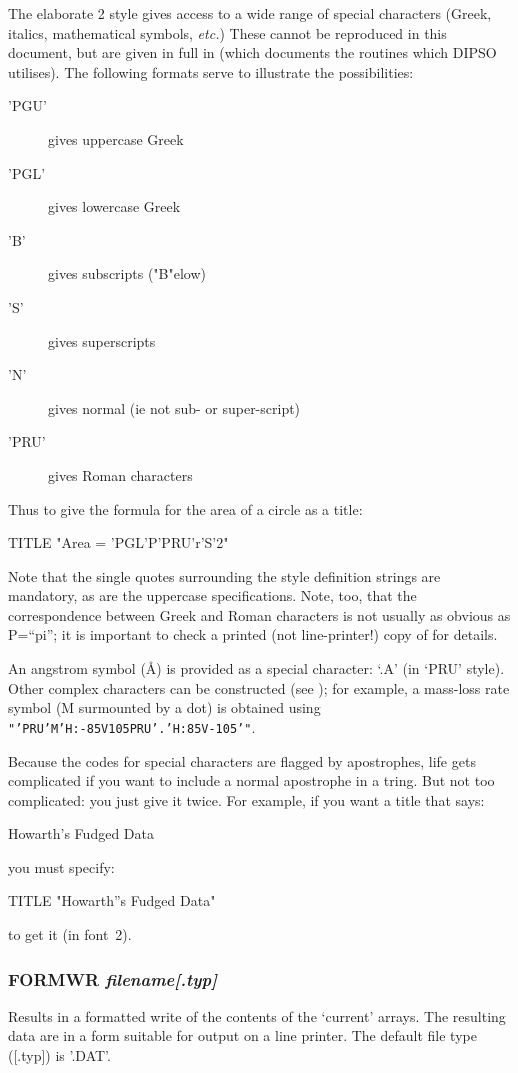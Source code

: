 \documentclass[twoside,11pt,noabs,nolof]{starlink}
\providecommand{\dipcom}[3]{\subsubsection*{\label{COM:#1}\xlabel{COM:#1}\textbf{#1} \emph{#2}}}
\newenvironment{dipdesc}{\begin{description}}{\end{description}}
\providecommand{\dipitem}[2]{ \item[{#1}] {#2} }
\begin{document}
The elaborate   2 style gives access to a wide range of special
characters (Greek, italics, mathematical symbols, \emph{etc.}) These
cannot be reproduced in this document, but are given in full in
(which documents the routines which DIPSO utilises). The following
formats serve to illustrate the possibilities:

\begin{dipdesc}
\dipitem {'PGU'}{ gives uppercase Greek}
\dipitem {'PGL'}{ gives lowercase Greek}
\dipitem {'B'}{ gives subscripts ("B"elow)}
\dipitem {'S'}{ gives superscripts}
\dipitem {'N'}{ gives normal (ie not sub- or super-script)}
\dipitem {'PRU'}{ gives Roman characters}
\end{dipdesc}

Thus to give the formula for the area of a circle as a title:

\begin{terminalv}
TITLE "Area = 'PGL'P'PRU'r'S'2"
\end{terminalv}

Note that the single quotes surrounding the style definition strings
are mandatory, as are the uppercase specifications. Note, too, that
the correspondence between Greek and Roman characters is not usually
as obvious as P=``pi''; it is important to check a printed (not
line-printer!) copy of  for details.

An angstrom symbol ({\AA}) is provided as a special character: `.A'
(in `PRU' style). Other complex characters can be constructed (see
); for example, a mass-loss rate symbol (M surmounted by a dot)
is obtained using {\texttt{"'PRU'M'H:-85V105PRU'.'H:85V-105'"}}.

Because the codes for special characters are flagged by apostrophes,
life gets complicated if you want to include a normal apostrophe in a
tring. But not too complicated: you just give it twice. For example,
if you want a title that says:

\begin{center}
Howarth's Fudged Data
\end{center}

you must specify:

\begin{terminalv}
TITLE "Howarth''s Fudged Data"
\end{terminalv}

to get it (in font~2).

\dipcom{FORMWR}{filename[.typ]}{Writes the contents of the current arrays to a text file}
Results in a formatted write of the contents of the `current' arrays.
The resulting data are in a form suitable for output on a line
printer. The default file type ([.typ]) is '.DAT'.
\end{document}
